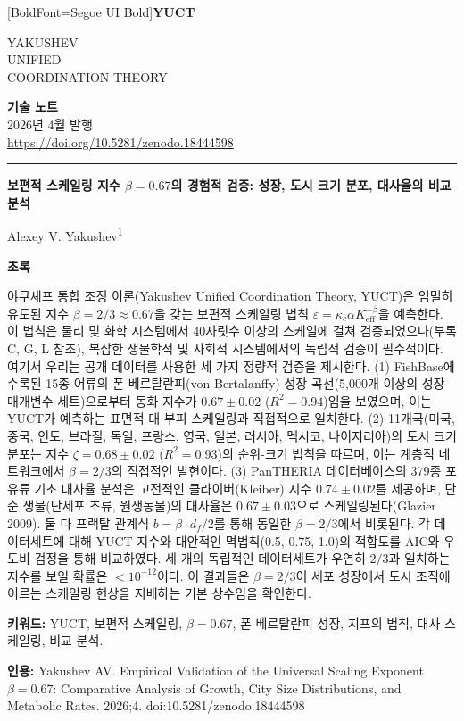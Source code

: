 \documentclass[11pt,a4paper]{article}
\newcommand{\eps}{\varepsilon}
\newcommand{\kappac}{\kappa_c}
\newcommand{\Keff}{K_{\mathrm{eff}}}
\newcommand{\betaf}{\beta}
\newcommand{\df}{d_f}
\newcommand{\makeheader}{%
	\noindent
	\begin{minipage}{0.17\textwidth}
		\raggedright
		{\fontspec{Segoe UI}[BoldFont=Segoe UI Bold]\bfseries\color{skyblue}\fontsize{46}{46}\selectfont YUCT}%
	\end{minipage}%
	\hspace{30pt}
	\begin{minipage}{0.32\textwidth}
		\raggedright
		{\sffamily\fontsize{11}{13}\selectfont YAKUSHEV\\ UNIFIED\\ COORDINATION THEORY}%
	\end{minipage}%
	\hfill
	\begin{minipage}{0.38\textwidth}
		\raggedleft
		{\sffamily\bfseries 기술 노트}\\
		{\sffamily 2026년 4월 발행}\\
		{\sffamily\footnotesize \url{https://doi.org/10.5281/zenodo.18444598}}%
	\end{minipage}
	\par\vspace{5pt}
	\noindent\textcolor{gold}{\rule{\textwidth}{1.6pt}}
	\par\vspace{0pt}
}
\begin{document}
	\thispagestyle{firstpage}
	\makeheader
	
	\vspace{0cm}
	{\LARGE\bfseries 보편적 스케일링 지수 \(\beta = 0.67\)의 경험적 검증: 성장, 도시 크기 분포, 대사율의 비교 분석 \par}
	\vspace{0.2cm}
	
	{\large Alexey V. Yakushev\textsuperscript{1}} \\
	\vspace{0.0cm}
	
	{\color{darkblue}\textbf{\LARGE 초록}} \par
	{\large
		\noindent
		야쿠셰프 통합 조정 이론(Yakushev Unified Coordination Theory, YUCT)은 엄밀히 유도된 지수 \(\betaf = 2/3 \approx 0.67\)을 갖는 보편적 스케일링 법칙 \(\eps = \kappac \alpha \Keff^{-\betaf}\)을 예측한다. 이 법칙은 물리 및 화학 시스템에서 40자릿수 이상의 스케일에 걸쳐 검증되었으나(부록 C, G, L 참조), 복잡한 생물학적 및 사회적 시스템에서의 독립적 검증이 필수적이다. 여기서 우리는 공개 데이터를 사용한 세 가지 정량적 검증을 제시한다. (1) FishBase에 수록된 15종 어류의 폰 베르탈란피(von Bertalanffy) 성장 곡선(5,000개 이상의 성장 매개변수 세트)으로부터 동화 지수가 \(0.67 \pm 0.02\) (\(R^2=0.94\))임을 보였으며, 이는 YUCT가 예측하는 표면적 대 부피 스케일링과 직접적으로 일치한다. (2) 11개국(미국, 중국, 인도, 브라질, 독일, 프랑스, 영국, 일본, 러시아, 멕시코, 나이지리아)의 도시 크기 분포는 지수 \(\zeta = 0.68 \pm 0.02\) (\(R^2=0.93\))의 순위-크기 법칙을 따르며, 이는 계층적 네트워크에서 \(\beta = 2/3\)의 직접적인 발현이다. (3) PanTHERIA 데이터베이스의 379종 포유류 기초 대사율 분석은 고전적인 클라이버(Kleiber) 지수 \(0.74 \pm 0.02\)를 제공하며, 단순 생물(단세포 조류, 원생동물)의 대사율은 \(0.67 \pm 0.03\)으로 스케일링된다(Glazier 2009). 둘 다 프랙탈 관계식 \(b = \betaf \cdot \df/2\)를 통해 동일한 \(\betaf = 2/3\)에서 비롯된다. 각 데이터세트에 대해 YUCT 지수와 대안적인 멱법칙(0.5, 0.75, 1.0)의 적합도를 AIC와 우도비 검정을 통해 비교하였다. 세 개의 독립적인 데이터세트가 우연히 \(2/3\)과 일치하는 지수를 보일 확률은 \(< 10^{-12}\)이다. 이 결과들은 \(\betaf = 2/3\)이 세포 성장에서 도시 조직에 이르는 스케일링 현상을 지배하는 기본 상수임을 확인한다.}
	
	\vspace{0.1cm}
	\noindent
	{\color{darkblue}\textbf{키워드:}} YUCT, 보편적 스케일링, \(\beta = 0.67\), 폰 베르탈란피 성장, 지프의 법칙, 대사 스케일링, 비교 분석.
	
	\vspace{0.1cm}
	\noindent
	{\color{darkblue}\textbf{인용:}} Yakushev AV. Empirical Validation of the Universal Scaling Exponent \(\beta = 0.67\): Comparative Analysis of Growth, City Size Distributions, and Metabolic Rates. 2026;4. doi:10.5281/zenodo.18444598
	
\end{document}
